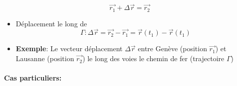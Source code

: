 \documentclass[
    11pt,
    a4paper,
    oneside,
    headinlcude, footinclude,
    twoside,
]{report}
\renewcommand{\vec}[1]{\overrightarrow{#1}}
\begin{document}
$$\vec{r_{1}} + \Delta \vec r = \vec{r_{2}}$$

\begin{itemize}
\item Déplacement le long de 
\begin{equation}
\Gamma: \Delta \vec r = \vec{r_{2}} - \vec{r_{1}} = \vec r (t_{1}) - \vec r (t_{1})
\end{equation}

\item \textbf{Exemple}: Le vecteur déplacement $\Delta \vec r$ entre
Genève (position $\vec{r_{1}}$) et Lausanne (position $\vec{r_{2}}$) le
long des voies le chemin de fer (trajectoire $\Gamma$)
\end{itemize}

\paragraph{Cas particuliers:}
\label{par:cas_particuliers_}
\end{document}
